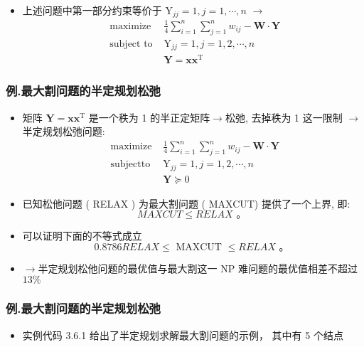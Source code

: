 \documentclass[handout]{beamer}
\begin{document}
\begin{frame}
\begin{frame}
\begin{itemize}
			\item 上述问题中第一部分约束等价于 $\mathrm{Y}_{j j}=1, j=1, \cdots, n$ $\rightarrow$
			$$
			\begin{array}{cl}
				\text { maximize } & \frac{1}{4} \sum_{i=1}^n \sum_{j=1}^n w_{i j}-\boldsymbol{W} \cdot \boldsymbol{Y} \\
				\text { subject to } & \mathrm{Y}_{j j}=1, j=1,2, \cdots, n \\
				& \boldsymbol{Y}=\boldsymbol{x} \boldsymbol{x}^{\mathrm{T}}
			\end{array}
			$$
			
			
		\end{itemize}
		
	\end{frame}
	
	
	\begin{frame}
		
		\frametitle{例.最大割问题的半定规划松弛}
		
		\begin{itemize}
			\item 	 矩阵 $\boldsymbol{Y}=\boldsymbol{x} \boldsymbol{x}^{\mathrm{T}}$ 是一个秩为 1 的半正定矩阵$\rightarrow$松弛,  去掉秩为 1 这一限制 $\rightarrow$半定规划松弛问题: 
			$$
			\begin{array}{cl}
				\text { maximize } & \frac{1}{4} \sum_{i=1}^n \sum_{j=1}^n w_{i j}-\boldsymbol{W} \cdot \boldsymbol{Y} \\
				\text { subjectto } & \mathrm{Y}_{j j}=1, j=1,2, \cdots, n \\
				& \boldsymbol{Y} \succeq 0
			\end{array}
			$$
			
			\item 已知松他问题 ( RELAX ) 为最大割问题 ( MAXCUT) 提供了一个上界, 即:
			$$
			M A X C U T \leqslant R E L A X \text { 。 }
			$$
			
			\item 可以证明下面的不等式成立
			$$
			0.8786 R E L A X \leqslant \text { MAXCUT } \leqslant R E L A X \text { 。 }
			$$
			\item $\rightarrow$半定规划松他问题的最优值与最大割这一 NP 难问题的最优值相差不超过 $13 \%$  
		\end{itemize}
		
	\end{frame}
	\begin{frame}
		
		\frametitle{例.最大割问题的半定规划松弛}
		
		\begin{itemize}
			\item 实例代码 3.6.1 给出了半定规划求解最大割问题的示例， 其中有 5 个结点 
			

\end{itemize}
\end{frame}
\end{frame}
\end{document}
